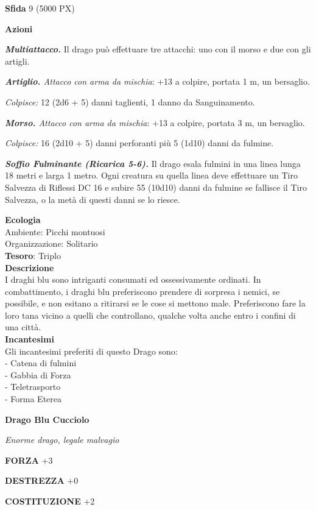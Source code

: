 \begin{multicols}{2}
\textbf{Sfida} 9 (5000 PX)

\textbf{Azioni}

\textit{\textbf{Multiattacco.}} Il drago può effettuare tre attacchi: uno con il morso e due con gli artigli.

\textit{\textbf{Artiglio.} Attacco con arma da mischia}: +13 a colpire, portata 1 m, un bersaglio.

\textit{Colpisce:} 12 (2d6 + 5) danni taglienti, 1 danno da Sanguinamento.

\textit{\textbf{Morso.} Attacco con arma da mischia}: +13 a colpire, portata 3 m, un bersaglio.

\textit{Colpisce:} 16 (2d10 + 5) danni perforanti più 5 (1d10) danni da fulmine.

\textit{\textbf{Soffio Fulminante (Ricarica 5-6).}} Il drago esala fulmini in una linea lunga 18 metri e larga 1 metro. Ogni creatura su quella linea deve effettuare un Tiro Salvezza di Riflessi DC 16 e subire 55 (10d10) danni da fulmine se fallisce il Tiro Salvezza, o la metà di questi danni se lo riesce.

\textbf{Ecologia}\\
Ambiente: Picchi montuosi\\
Organizzazione: Solitario\\
\textbf{Tesoro}: Triplo\\
\textbf{Descrizione}\\
I draghi blu sono intriganti consumati ed ossessivamente ordinati. In combattimento, i draghi blu preferiscono prendere di sorpresa i nemici, se possibile, e non esitano a ritirarsi se le cose si mettono male. Preferiscono fare la loro tana vicino a quelli che controllano, qualche volta anche entro i confini di una città.\\
\textbf{Incantesimi}\\
Gli incantesimi preferiti di questo Drago sono:\\
- Catena di fulmini\\
- Gabbia di Forza\\
- Teletrasporto\\
- Forma Eterea


\medskip{}\textbf{Drago Blu Cucciolo}

\textit{Enorme drago, legale malvagio}

\textbf{FORZA} +3

\textbf{DESTREZZA} +0

\textbf{COSTITUZIONE} +2


\end{multicols}
